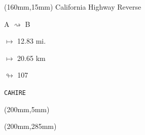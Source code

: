\begin{textblock*}{40mm}(160mm,15mm)%
California Highway Reverse
\par A $\rightsquigarrow$ B
\Large
\par$\mapsto$ 12.83 mi.
\par$\mapsto$ 20.65 km
\par$\looparrowright$ 107
\par\hfill\tiny\tt CAHIRE\\
\end{textblock*}
\begin{textblock*}{20mm}(200mm,5mm)%
\fbox{\thepage}
\end{textblock*}
\begin{textblock*}{20mm}(200mm,285mm)%
\fbox{\thepage}
\end{textblock*}
\null\newpage

